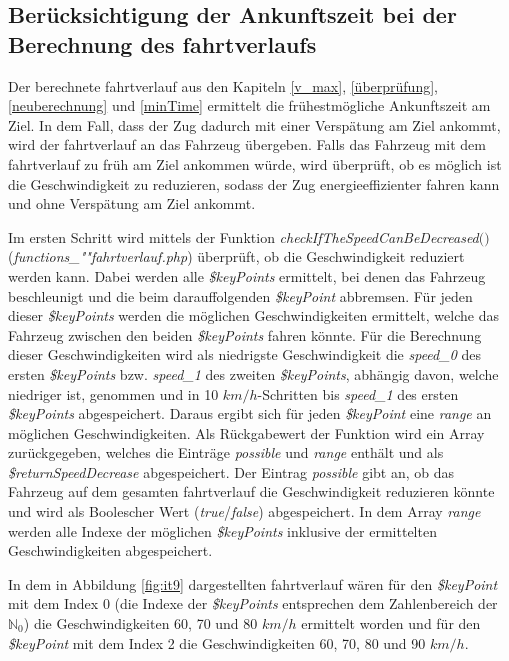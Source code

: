 \subsection{Berücksichtigung der Ankunftszeit bei der Berechnung des \Gls{fahrtverlauf}s} \label{time}
Der berechnete \Gls{fahrtverlauf} aus den Kapiteln \ref{v_max}, \ref{überprüfung}, \ref{neuberechnung} und \ref{minTime} ermittelt die frühestmögliche Ankunftszeit am Ziel. In dem Fall, dass der Zug dadurch mit einer Verspätung am Ziel ankommt, wird der \Gls{fahrtverlauf} an das Fahrzeug übergeben. Falls das Fahrzeug mit dem \Gls{fahrtverlauf} zu früh am Ziel ankommen würde, wird überprüft, ob es möglich ist die Geschwindigkeit zu reduzieren, sodass der Zug energieeffizienter fahren kann und ohne Verspätung am Ziel ankommt. 

Im ersten Schritt wird mittels der Funktion \textit{check\-If\-The\-Speed\-Can\-Be\-De\-creased$($$)$}\linebreak[4](\textit{func\-tions\_""fahrt\-ver\-lauf\-.php}) überprüft, ob die Geschwindigkeit reduziert werden kann. Dabei werden alle \textit{\$keyPoints} ermittelt, bei denen das Fahrzeug beschleunigt und die beim darauffolgenden \textit{\$keyPoint} abbremsen. Für jeden dieser \textit{\$keyPoints} werden die möglichen Geschwindigkeiten ermittelt, welche das Fahrzeug zwischen den beiden \textit{\$key\-Points} fahren könnte. Für die Berechnung dieser Geschwindigkeiten wird als niedrigste Geschwindigkeit die \textit{speed\_0} des ersten \textit{\$key\-Points} bzw. \textit{speed\_1} des zweiten \textit{\$key\-Points}, abhängig davon, welche niedriger ist, genommen und in 10 $km/h$-Schritten bis  \textit{speed\_1} des ersten \textit{\$keyPoints} abgespeichert. Daraus ergibt sich für jeden \textit{\$keyPoint} eine \textit{range} an möglichen Geschwindigkeiten. Als Rückgabewert der Funktion wird ein Array zurückgegeben, welches die Einträge \textit{possible} und \textit{range} enthält und als \textit{\$return\-Speed\-Decrease} abgespeichert. Der Eintrag \textit{possible} gibt an, ob das Fahrzeug auf dem gesamten \Gls{fahrtverlauf} die Geschwindigkeit reduzieren könnte und wird als Boolescher Wert (\textit{true}/\textit{false}) abgespeichert. In dem Array \textit{range} werden alle Indexe der möglichen \textit{\$keyPoints} inklusive der ermittelten Geschwindigkeiten abgespeichert.

In dem in Abbildung \ref{fig:it9} dargestellten \Gls{fahrtverlauf} wären für den \textit{\$keyPoint} mit dem Index 0 (die Indexe der \textit{\$keyPoints} entsprechen dem Zahlenbereich der $\mathbb{N}_0$) die Geschwindigkeiten 60, 70 und 80 $km/h$ ermittelt worden und für den \textit{\$keyPoint} mit dem Index 2 die Geschwindigkeiten 60, 70, 80 und 90 $km/h$.

